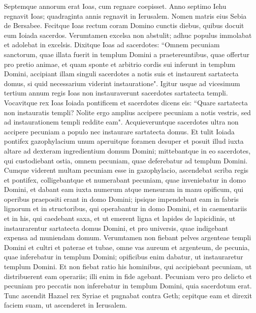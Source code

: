 \begin{biblechapter}  
\verse Septemque annorum erat Ioas, cum regnare coepisset. 
\verse Anno septimo Iehu regnavit Ioas; quadraginta annis regnavit in Ierusalem. Nomen matris eius Sebia de Bersabee. 
\verse Fecitque Ioas rectum coram Domino cunctis diebus, quibus docuit eum Ioiada sacerdos. 
\verse Verumtamen excelsa non abstulit; adhuc populus immolabat et adolebat in excelsis. 
\verse Dixitque Ioas ad sacerdotes: “Omnem pecuniam sanctorum, quae illata fuerit in templum Domini a praetereuntibus, quae offertur pro pretio animae, et quam sponte et arbitrio cordis sui inferunt in templum Domini, 
\verse accipiant illam singuli sacerdotes a notis suis et instaurent sartatecta domus, si quid necessarium viderint instauratione". 
\verse Igitur usque ad vicesimum tertium annum regis Ioas non instauraverunt sacerdotes sartatecta templi. 
\verse Vocavitque rex Ioas Ioiada pontificem et sacerdotes dicens eis: “Quare sartatecta non instauratis templi? Nolite ergo amplius accipere pecuniam a notis vestris, sed ad instaurationem templi reddite eam". 
\verse Acquieveruntque sacerdotes ultra non accipere pecuniam a populo nec instaurare sartatecta domus. 
\verse Et tulit Ioiada pontifex gazophylacium unum aperuitque foramen desuper et posuit illud iuxta altare ad dexteram ingredientium domum Domini; mittebantque in eo sacerdotes, qui custodiebant ostia, omnem pecuniam, quae deferebatur ad templum Domini. 
\verse Cumque viderent multam pecuniam esse in gazophylacio, ascendebat scriba regis et pontifex, colligebantque et numerabant pecuniam, quae inveniebatur in domo Domini, 
\verse et dabant eam iuxta numerum atque mensuram in manu opificum, qui operibus praepositi erant in domo Domini; ipsique impendebant eam in fabris lignorum et in structoribus, qui operabantur in domo Domini, 
\verse et in caementariis et in his, qui caedebant saxa, et ut emerent ligna et lapides de lapicidinis, ut instaurarentur sartatecta domus Domini, et pro universis, quae indigebant expensa ad muniendam domum. 
\verse Verumtamen non fiebant pelves argenteae templi Domini et cultri et paterae et tubae, omne vas aureum et argenteum, de pecunia, quae inferebatur in templum Domini; 
\verse opificibus enim dabatur, ut instauraretur templum Domini. 
\verse Et non fiebat ratio his hominibus, qui accipiebant pecuniam, ut distribuerent eam operariis; illi enim in fide agebant. 
\verse Pecuniam vero pro delicto et pecuniam pro peccatis non inferebatur in templum Domini, quia sacerdotum erat. 
\verse Tunc ascendit Hazael rex Syriae et pugnabat contra Geth; cepitque eam et direxit faciem suam, ut ascenderet in Ierusalem. 

\end{biblechapter}
